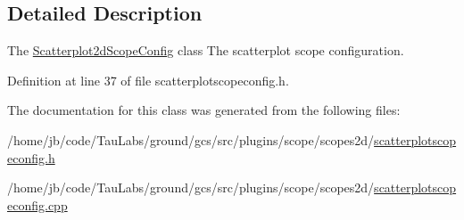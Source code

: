 \subsection{\-Detailed \-Description}
\-The \hyperlink{class_scatterplot2d_scope_config}{\-Scatterplot2d\-Scope\-Config} class \-The scatterplot scope configuration. 

\-Definition at line 37 of file scatterplotscopeconfig.\-h.



\-The documentation for this class was generated from the following files\-:\begin{DoxyCompactItemize}
\item 
/home/jb/code/\-Tau\-Labs/ground/gcs/src/plugins/scope/scopes2d/\hyperlink{scatterplotscopeconfig_8h}{scatterplotscopeconfig.\-h}\item 
/home/jb/code/\-Tau\-Labs/ground/gcs/src/plugins/scope/scopes2d/\hyperlink{scatterplotscopeconfig_8cpp}{scatterplotscopeconfig.\-cpp}\end{DoxyCompactItemize}
